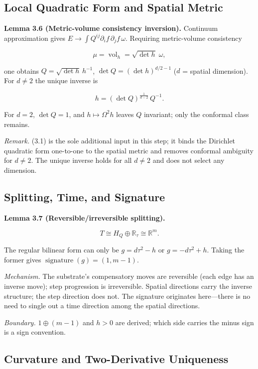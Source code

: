 \documentclass[
  11pt,
]{article}
\begin{document}
\subsection{Local Quadratic Form and Spatial
Metric}\label{local-quadratic-form-and-spatial-metric}

\textbf{Lemma 3.6 (Metric-volume consistency inversion).} Continuum
approximation gives \(E\to\int Q^{ij}\partial_if\,\partial_jf\,\omega\).
Requiring metric-volume consistency

\[
\mu=\operatorname{vol}_h=\sqrt{\det h}\;\omega,
\tag{3.1}
\]

one obtains \(Q=\sqrt{\det h}\,h^{-1}\), \(\det Q=(\det h)^{d/2-1}\)
(\(d\) = spatial dimension). For \(d\neq2\) the unique inverse is

\[
h=(\det Q)^{\frac{1}{d-2}}\,Q^{-1}.
\tag{3.2}
\]

For \(d=2\), \(\det Q=1\), and \(h\mapsto\Omega^2h\) leaves \(Q\)
invariant; only the conformal class remains.

\emph{Remark.} (3.1) is the sole additional input in this step; it binds
the Dirichlet quadratic form one-to-one to the spatial metric and
removes conformal ambiguity for \(d\neq2\). The unique inverse holds for
all \(d\neq2\) and does not select any dimension.

\subsection{Splitting, Time, and
Signature}\label{splitting-time-and-signature}

\textbf{Lemma 3.7 (Reversible/irreversible splitting).}

\[
T\cong H_Q\oplus\mathbb R_\tau\cong\mathbb R^m.
\]

The regular bilinear form can only be \(g=d\tau^2-h\) or
\(g=-d\tau^2+h\). Taking the former gives
\(\operatorname{signature}(g)=(1,m-1)\).

\emph{Mechanism.} The substrate's compensatory moves are reversible
(each edge has an inverse move); step progression is irreversible.
Spatial directions carry the inverse structure; the step direction does
not. The signature originates here---there is no need to single out a
time direction among the spatial directions.

\emph{Boundary.} \(1\oplus(m-1)\) and \(h>0\) are derived; which side
carries the minus sign is a sign convention.

\subsection{Curvature and Two-Derivative
Uniqueness}\label{curvature-and-two-derivative-uniqueness}
\end{document}
